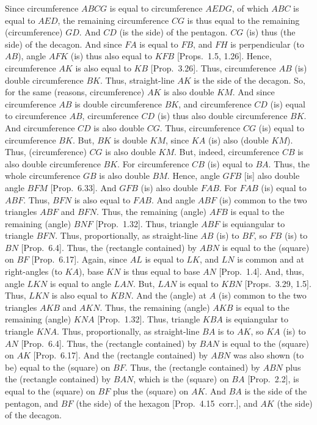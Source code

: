 Since circumference $ABCG$ is equal to circumference $AEDG$,
of which $ABC$ is equal to $AED$, the remaining circumference
$CG$ is thus equal to the remaining (circumference) $GD$. And $CD$ (is the side) of the pentagon. 
$CG$ (is) thus (the side) of the decagon. And since  $FA$ is equal to $FB$,
and $FH$ is perpendicular (to $AB$), angle $AFK$ (is) thus also equal
to $KFB$ [Props.~1.5, 1.26]. Hence, circumference $AK$
is also equal to $KB$ [Prop.~3.26]. Thus, circumference $AB$ (is)
double circumference $BK$. Thus, straight-line $AK$ is the side of the decagon. 
So, for the same (reasons, circumference)  $AK$ is also double $KM$. And since
circumference $AB$ is double circumference $BK$, and
circumference $CD$ (is) equal to circumference $AB$, circumference
$CD$ (is) thus also double circumference $BK$. And
circumference $CD$ is also double $CG$. Thus, circumference
$CG$ (is) equal to circumference $BK$. But, $BK$
is double $KM$, since $KA$ (is) also (double $KM$). Thus,
(circumference) $CG$ is also double $KM$. But, indeed, circumference $CB$ is also
double circumference $BK$. For circumference $CB$ (is) equal to $BA$. 
Thus, the whole circumference $GB$ is also double $BM$. 
Hence, angle $GFB$ [is] also double  angle $BFM$ [Prop.~6.33].
And $GFB$ (is) also double $FAB$. For $FAB$ (is) equal to $ABF$. 
Thus, $BFN$ is also equal to $FAB$. And angle $ABF$ (is) common
to the two triangles $ABF$ and $BFN$. Thus, the
remaining (angle) $AFB$ is equal to the remaining (angle) $BNF$
[Prop.~1.32]. Thus, triangle $ABF$ is equiangular to triangle
$BFN$. Thus, proportionally, as straight-line $AB$ (is) to
$BF$, so $FB$ (is) to $BN$ [Prop.~6.4]. Thus, the (rectangle contained)
by $ABN$ is equal to the (square) on $BF$ [Prop.~6.17]. Again,
since $AL$ is equal to $LK$, and $LN$ is common and at right-angles (to $KA$), 
base $KN$ is thus equal to base $AN$  [Prop.~1.4]. And, thus, angle
$LKN$ is equal to angle $LAN$. But, $LAN$ is equal to
$KBN$ [Props.~3.29, 1.5]. Thus, $LKN$ is also equal to $KBN$. 
And the (angle) at $A$ (is) common to the two triangles $AKB$ and
$AKN$. Thus, the remaining (angle) $AKB$ is equal to the
remaining (angle) $KNA$ [Prop.~1.32]. Thus, triangle $KBA$ is
equiangular to triangle $KNA$. Thus, proportionally, as straight-line
$BA$ is to $AK$, so $KA$ (is) to $AN$ [Prop.~6.4]. Thus, the
(rectangle contained) by $BAN$ is equal to the (square) on $AK$ [Prop.~6.17]. 
And  the (rectangle contained) by $ABN$ was also shown (to be)
equal to the (square) on $BF$. Thus, the (rectangle contained) by $ABN$
plus the (rectangle contained) by $BAN$, which is the (square) on $BA$
[Prop.~2.2],
is equal to the (square) on $BF$ plus the (square) on $AK$. 
And $BA$ is the side of the pentagon, and $BF$ (the side) of the hexagon
[Prop.~4.15~corr.], and $AK$ (the side) of the decagon.

